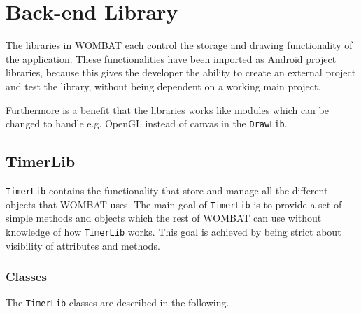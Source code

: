 \section{Back-end Library}
\label{sec:backend}
The libraries in WOMBAT each control the storage and drawing functionality of the application.
These functionalities have been imported as Android project libraries, because this gives the developer the ability to create an external project and test the library, without being dependent on a working main project.

Furthermore is a benefit that the libraries works like modules which can be changed to handle e.g. OpenGL instead of canvas in the \texttt{DrawLib}.


\subsection{TimerLib}
\label{subsec:TimerLib}
\texttt{TimerLib} contains the functionality that store and manage all the different objects that WOMBAT uses. The main goal of \texttt{TimerLib} is to provide a set of simple methods and objects which the rest of WOMBAT can use without knowledge of how \texttt{TimerLib} works. This goal is achieved by being strict about visibility of attributes and methods.

\subsubsection{Classes}
The \texttt{TimerLib} classes are described in the following.

